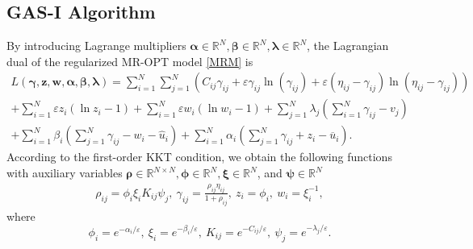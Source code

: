 \documentclass[review,hidelinks,onefignum,onetabnum]{siamart220329}
\begin{document}
\subsection{GAS-I Algorithm}\label{subsec:GAS-I}
By introducing Lagrange multipliers $\bm{\alpha}\in \mathbb{R}^N,\bm{\beta}\in \mathbb{R}^N,\bm{\lambda}\in \mathbb{R}^N$, the Lagrangian dual of the regularized MR-OPT model \cref{MRM} is
\begin{multline}\label{Langrange}
    L(\bm{\gamma},\bm{z},\bm{w},\bm{\alpha},\bm{\beta},\bm{\lambda}) = \sum_{i=1}^{N}\sum_{j=1}^{N} (C_{ij}\gamma_{ij}+\varepsilon \gamma_{ij} \ln(\gamma_{ij})+\varepsilon (\eta_{ij}-\gamma_{ij}) \ln(\eta_{ij}-\gamma_{ij})) \\
	 +\sum_{i=1}^{N} \varepsilon z_i \left(\ln z_i-1 \right)+
		\sum_{i=1}^{N} \varepsilon w_i (\ln w_i-1)
        +\sum_{j=1}^{N}\lambda_j\left(\sum_{i=1}^{N}\gamma_{ij}-v_j\right) \\
         +\sum_{i=1}^{N}\beta_i\left(\sum_{j=1}^{N}\gamma_{ij}-w_i-\hat{u}_i\right) + \sum_{i=1}^{N}\alpha_i\left(\sum_{j=1}^{N}\gamma_{ij}+z_i-\overline{u}_i\right). 
\end{multline}
According to the first-order KKT condition, 
we obtain the following functions with auxiliary variables $\bm{\rho}\in \mathbb{R}^{N\times N},\bm{\phi}\in \mathbb{R}^N,\bm{\xi}\in \mathbb{R}^N$, and $\bm{\psi}\in \mathbb{R}^N$
\begin{equation}\label{Langrange-1}
	\begin{aligned}
		\rho_{ij}=\phi_i \xi_i K_{ij} \psi_j, \
		\gamma_{ij}=\frac{\rho_{ij}\eta_{ij}}{1+\rho_{ij}},\
		z_i=\phi_i,\
		w_i=\xi_i^{-1}, 
	\end{aligned}
\end{equation}	
where 
\begin{equation*}
    \phi_i=e^{-\alpha_i / \varepsilon},\ \xi_i=e^{-\beta_i / \varepsilon}, \ K_{ij}=e^{- C_{ij} / \varepsilon}, \ \psi_j=e^{- \lambda_j / \varepsilon}. 
\end{equation*}
\end{document}

